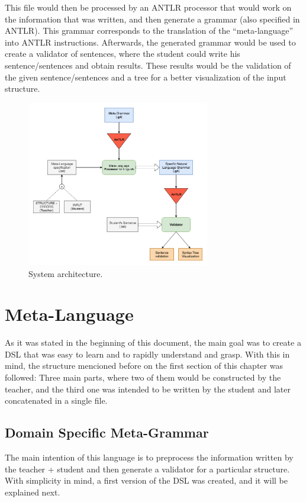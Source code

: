 This file would then be processed by an \textsc{ANTLR} processor that would work on the information that was written, and then generate a grammar (also specified in \textsc{ANTLR}). This grammar corresponds to the translation of the ``meta-language'' into \textsc{ANTLR} instructions. Afterwards, the generated grammar would be used to create a validator of sentences, where the student could write his sentence/sentences and obtain results. These results would be the validation of the given sentence/sentences and a tree for a better visualization of the input structure.

\begin{figure}[h]
    \centering
    \includegraphics[width=8cm]{images/msc_system_architecture.png}
    \caption{System architecture.}
    \label{fig:system_architecture}
\end{figure}

\section{Meta-Language}
As it was stated in the beginning of this document, the main goal was to create a \textsc{DSL} that was easy to learn and to rapidly understand and grasp. With this in mind, the structure mencioned before on the first section of this chapter was followed: Three main parts, where two of them would be constructed by the teacher, and the third one was intended to be written by the student and later concatenated in a single file.

\subsection{Domain Specific Meta-Grammar}
The main intention of this language is to preprocess the information written by the teacher + student and then generate a validator for a particular structure. With simplicity in mind, a first version of the \textsc{DSL} was created, and it will be explained next.

